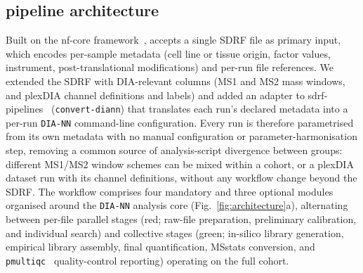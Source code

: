 \subsection{\quantmsdiann{} pipeline architecture}
\label{sec:architecture}

Built on the nf-core framework~\cite{ewels2020nfcore}, \quantmsdiann{} accepts a single SDRF file as primary input, which encodes per-sample metadata (cell line or tissue origin, factor values, instrument, post-translational modifications) and per-run file references. We extended the SDRF with DIA-relevant columns (MS1 and MS2 mass windows, and plexDIA channel definitions and labels) and added an adapter to sdrf-pipelines~\cite{dai2021sdrf} (\texttt{convert-diann}) that translates each run's declared metadata into a per-run \texttt{DIA-NN} command-line configuration. Every run is therefore parametrised from its own metadata with no manual configuration or parameter-harmonisation step, removing a common source of analysis-script divergence between groups: different MS1/MS2 window schemes can be mixed within a cohort, or a plexDIA dataset run with its channel definitions, without any workflow change beyond the SDRF.
The workflow comprises four mandatory and three optional modules organised around the \texttt{DIA-NN} analysis core (Fig.~\ref{fig:architecture}a), alternating between per-file parallel stages (red; raw-file preparation, preliminary calibration, and individual search) and collective stages (green; in-silico library generation, empirical library assembly, final quantification, MSstats conversion, and \texttt{pmultiqc}~\cite{larrea2025pmultiqc} quality-control reporting) operating on the full cohort.

